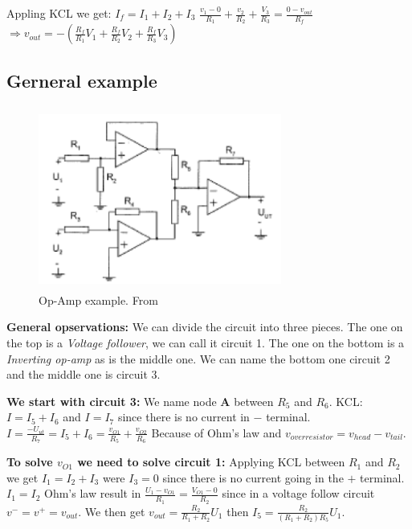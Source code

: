 Appling KCL we get: $I_f=I_1+I_2+I_3$ 
$\frac{v_1-0}{R_1} + \frac{v_2}{R_2} + \frac{V_3}{R_3} = \frac{0-v_{out}}{R_f}$
$\Rightarrow v_{out}=-(\frac{R_f}{R_1}V_1 + \frac{R_f}{R_2}V_2 + \frac{R_f}{R_3}V_3)$

\newpage
\subsection{Gerneral example}
\begin{figure}[h]
    \vspace{10mm}
    \centering
    \includegraphics[width=8cm, height=6cm]{image/op-amp-example.png}
    \caption{Op-Amp example. From \cite{}}
\end{figure}
\textbf{General opservations:} 
We can divide the circuit into three pieces. The one on the top is a   
\textit{Voltage follower}, we can call it circuit 1. The one on the bottom
is a \textit{Inverting op-amp} as is the middle one. We can name the bottom
one circuit 2 and the middle one is circuit 3.
\vspace{3mm}

\textbf{We start with circuit 3:} \newline
We name node \textbf{A} between $R_5$ and $R_6$. KCL: $I=I_5+I_6$ and $I=I_7$ since \newline
there is no current in $-$ terminal. \newline
$I=\frac{-U_{ut}}{R_7}=I_5+I_6=\frac{v_{O1}}{R_5}+\frac{v_{O2}}{R_6}$ \newline
Because of Ohm's law and $v_{over resistor}=v_{head}-v_{tail}$. \newline
\vspace{3mm}

\textbf{To solve $v_{O1}$ we need to solve circuit 1:} \newline
Applying KCL between $R_1$ and $R_2$ we get $I_1=I_2+I_3$ were $I_3=0$ since \newline
there is no current going in the $+$ terminal. $I_1=I_2$ Ohm's law result in \newline
$\frac{U_1-v_{O1}}{R_1}=\frac{V_{O1}-0}{R_2}$ since in a voltage follow circuit \newline
$v^-=v^+=v_{out}$. We then get $v_{out}=\frac{R_2}{R_1+R_2}U_1$ \newline
then $I_5=\frac{R_2}{(R_1+R_2)R_5}U_1$. \newline
\vspace{3mm}


